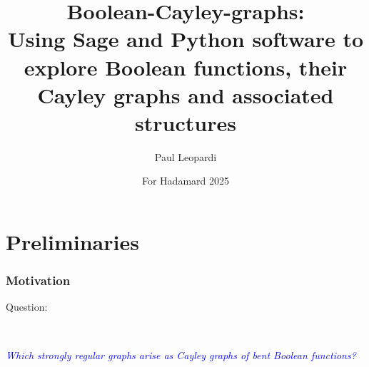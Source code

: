 \documentclass[pdf,sprung,slideColor,nocolorBG]{beamer}
\title[Boolean-Cayley-graphs: exploring Bent functions and their Cayley graphs]{Boolean-Cayley-graphs: \\
Using Sage and Python software to explore Boolean functions, their Cayley graphs and associated structures}
\author{Paul Leopardi}
\date{For Hadamard 2025}
\institute{ACCESS-NRI
\\
The Australian National University}
\newenvironment{colortheme}[1]{
\def\ProvidesPackageRCS $##1${\relax}
\renewcommand{\ProcessOptions}{\relax}
\makeatletter

\makeatother
}{}
\newcommand{\Emph}[1]{\emph{\textcolor{blue}{#1}}}
\begin{document}
\begin{colortheme}{access}
\frame{\titlepage}
\end{colortheme}

\section{Preliminaries}

\begin{colortheme}{access}

\begin{frame}
\frametitle{Motivation}

Question:

~

\Emph{Which strongly regular graphs arise as Cayley graphs of bent Boolean functions?}

\end{frame}
\end{colortheme}
\end{document}
